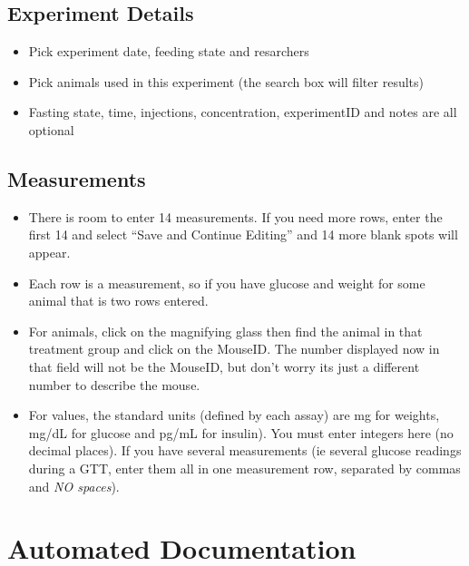 \documentclass[letterpaper,10pt,english]{sphinxmanual}
\begin{document}
\section{Experiment Details}
\begin{itemize}
\item {} 
Pick experiment date, feeding state and resarchers

\item {} 
Pick animals used in this experiment (the search box will filter results)

\item {} 
Fasting state, time, injections, concentration, experimentID and notes are all optional

\end{itemize}


\section{Measurements}
\begin{itemize}
\item {} 
There is room to enter 14 measurements.  If you need more rows, enter the first 14 and select ``Save and Continue Editing'' and 14 more blank spots will appear.

\item {} 
Each row is a measurement, so if you have glucose and weight for some animal that is two rows entered.

\item {} 
For animals, click on the magnifying glass then find the animal in that treatment group and click on the MouseID. The number displayed now in that field will not be the MouseID, but don't worry its just a different number to describe the mouse.

\item {} 
For values, the standard units (defined by each assay) are mg for weights, mg/dL for glucose and pg/mL for insulin).  You must enter integers here (no decimal places).  If you have several measurements (ie several glucose readings during a GTT, enter them all in one measurement row, separated by commas and \emph{NO spaces}).

\end{itemize}

\resetcurrentobjects
\hypertarget{--doc-api}{}

\chapter{Automated Documentation}
\end{document}
